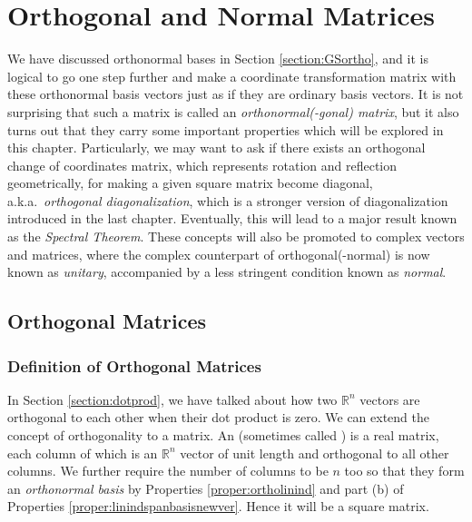 \chapter{Orthogonal and Normal Matrices}
\label{chap:normalmat}

We have discussed orthonormal bases in Section \ref{section:GSortho}, and it is logical to go one step further and make a coordinate transformation matrix with these orthonormal basis vectors just as if they are ordinary basis vectors. It is not surprising that such a matrix is called an \textit{orthonormal(-gonal) matrix}, but it also turns out that they carry some important properties which will be explored in this chapter. Particularly, we may want to ask if there exists an orthogonal change of coordinates matrix, which represents rotation and reflection geometrically, for making a given square matrix become diagonal, a.k.a.\ \textit{orthogonal diagonalization}, which is a stronger version of diagonalization introduced in the last chapter. Eventually, this will lead to a major result known as the \textit{Spectral Theorem}. These concepts will also be promoted to complex vectors and matrices, where the complex counterpart of orthogonal(-normal) is now known as \textit{unitary}, accompanied by a less stringent condition known as \textit{normal}. 

\section{Orthogonal Matrices}

\subsection{Definition of Orthogonal Matrices}
In Section \ref{section:dotprod}, we have talked about how two $\mathbb{R}^n$ vectors are orthogonal to each other when their dot product is zero. We can extend the concept of orthogonality to a matrix. An  (sometimes called ) is a real matrix, each column of which is an $\mathbb{R}^n$ vector of unit length and orthogonal to all other columns. We further require the number of columns to be $n$ too so that they form an \textit{orthonormal basis} by Properties \ref{proper:ortholinind} and part (b) of Properties \ref{proper:linindspanbasisnewver}. Hence it will be a square matrix.

